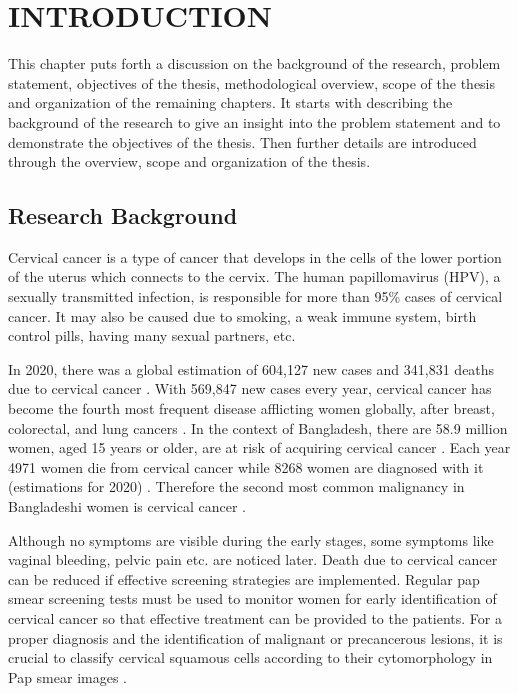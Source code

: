 \chapter{INTRODUCTION}
\label{chap1:intro}




This chapter puts forth a discussion on the background of the research, problem statement, objectives of the thesis, methodological overview, scope of the thesis and organization of the remaining chapters. It starts with describing the background of the research to give an insight into the problem statement and to demonstrate the objectives of the thesis. Then further details are introduced through the overview, scope and organization of the thesis.

\section{Research Background}

Cervical cancer is a type of cancer that develops in the cells of the lower portion of the uterus which connects to the cervix. The human papillomavirus (HPV), a sexually transmitted infection, is responsible for more than 95\% cases of cervical cancer. 
It may also be caused due to smoking, a weak immune system, birth control pills, having many sexual partners, etc. 

In 2020, there was a global estimation of 604,127 new cases and 341,831 deaths due to cervical cancer \cite{ar1}. With 569,847 new cases every year, cervical cancer has become the fourth most frequent disease afflicting women globally, after breast, colorectal, and lung cancers \cite{ar2}. In the context of Bangladesh, there are 58.9 million women, aged 15 years or older, are at risk of acquiring cervical cancer \cite{b1}. Each year 4971 women die from cervical cancer while 8268 women are diagnosed with it (estimations for 2020) \cite{b1}. Therefore the second most common malignancy in Bangladeshi women is cervical cancer \cite{b1}. 

Although no symptoms are visible during the early stages, some symptoms like vaginal bleeding, pelvic pain etc. are noticed later. Death due to cervical cancer can be reduced if effective screening strategies are implemented. Regular pap smear screening tests must be used to monitor women for early identification of cervical cancer so that effective treatment can be provided to the patients. For a proper diagnosis and the identification of malignant or precancerous lesions, it is crucial to classify cervical squamous cells according to their cytomorphology in Pap smear images \cite{ar3}.

